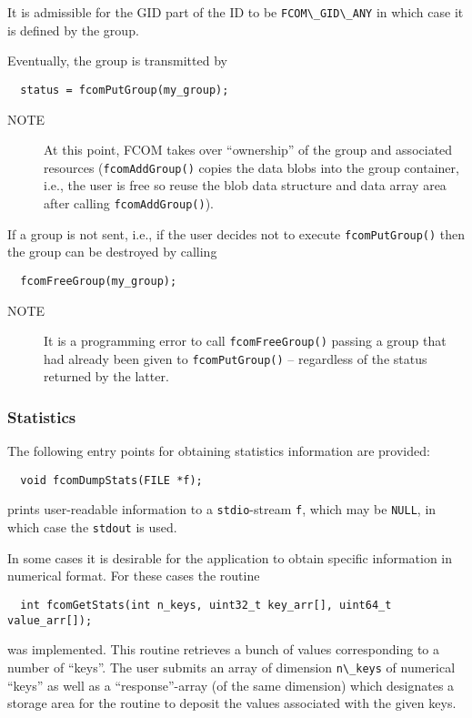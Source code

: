 \documentclass[11pt]{article}
\newcommand{\fcom}{FCOM}
\newcommand{\blob}{blob}
\newcommand{\group}{group}
\newcommand{\cstl}[1]{{\lstinline+#1+}}
\newcommand{\note}[1]{
	\begin{description}
		\item[NOTE] #1
	\end{description}
}
\begin{document}
      It is admissible for the GID part of the ID to
      be \cstl{FCOM\_GID\_ANY} in which case it is defined
      by the group.

      Eventually, the \group{} is transmitted by
      \begin{verbatim}
  status = fcomPutGroup(my_group);
      \end{verbatim}
      \note{At this point, \fcom{} takes over 
      ``ownership'' of the group and associated resources
      ({\tt fcomAddGroup()} copies the data \blob{}s
      into the \group{} container, i.e., the user is
      free so reuse the \blob{} data structure and data 
      array area after calling {\tt fcomAddGroup()}).}

      If a \group{} is not sent, i.e., if the
      user decides not to execute {\tt fcomPutGroup()}
      then the \group{} can be destroyed by
      calling
      \begin{verbatim}
  fcomFreeGroup(my_group);
      \end{verbatim}
      \note{It is a programming error to call {\tt fcomFreeGroup()}
            passing a \group{} that had already been given to
            {\tt fcomPutGroup()} -- regardless of the status
            returned by the latter.}
    \subsubsection{Statistics}
      The following entry points for obtaining statistics information are
      provided:
      \begin{verbatim}
  void fcomDumpStats(FILE *f);
      \end{verbatim}
      prints user-readable information to a \cstl{stdio}-stream
      \cstl{f}, which may be \cstl{NULL}, in which case
      the \cstl{stdout} is used.

      In some cases it is desirable for the application to obtain
      specific information in numerical format. For these cases
      the routine
      \begin{verbatim}
  int fcomGetStats(int n_keys, uint32_t key_arr[], uint64_t value_arr[]);
      \end{verbatim}
      was implemented. This routine retrieves a bunch of values
      corresponding to a number of ``keys''. The user submits an
      array of dimension \cstl{n\_keys} of numerical ``keys''
      as well as a ``response''-array (of the same dimension) which
      designates a storage area for the routine to deposit the
      values associated with the given keys.
\end{document}
